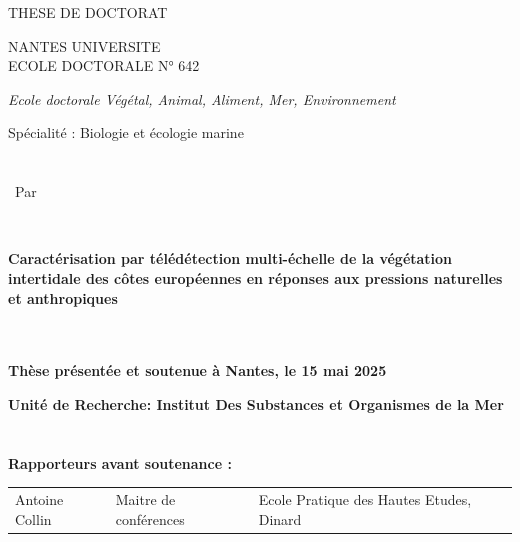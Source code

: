 \documentclass[
  letterpaper,
  11pt,
  english,
  singlespacing,
  headsepline]{MastersDoctoralThesis}
\begin{document}
\begin{titlepage}
\AddToShipoutPictureBG*{%
    \BackgroundImage
}

\vspace{1.2cm}

{\LARGE {\Huge T}HESE DE DOCTORAT}

\vspace{1.8cm}
{\fontsize{14}{18}\selectfont NANTES UNIVERSITE} \\

{\large E}COLE {\large D}OCTORALE N° 642


{\fontsize{12}{16}\selectfont \textit{Ecole doctorale Végétal, Animal, Aliment, Mer, Environnement}}

{\fontsize{12}{16}\selectfont Spécialité : Biologie et écologie marine} \\\\\\

{\fontsize{12}{16}\ Par}
\vspace{0.2cm}

 \\

\parbox{17cm}{
{\fontsize{16}{20}\selectfont \textbf{Caractérisation par télédétection multi-échelle de la végétation intertidale des côtes européennes en réponses aux pressions naturelles et anthropiques} }
}\\\\

{\fontsize{11}{15}\selectfont \textbf{Thèse présentée et soutenue à Nantes, le 15 mai 2025}}

{\fontsize{11}{15}\selectfont \textbf{Unité de Recherche: Institut Des Substances et Organismes de la Mer}}
\\\\\\

{\fontsize{12}{16}\selectfont \textbf{Rapporteurs avant soutenance :}}

\begin{tabular}{@{}l l l@{}}
    {\fontsize{10}{14}\selectfont \textcolor{textgray}{Antoine Collin}} & 
    {\fontsize{10}{14}\selectfont \textcolor{textgray}{Maitre de conférences}} & 
    {\fontsize{10}{14}\selectfont \textcolor{textgray}{Ecole Pratique des Hautes Etudes, Dinard}} \\


\end{tabular}
\end{titlepage}
\end{document}

